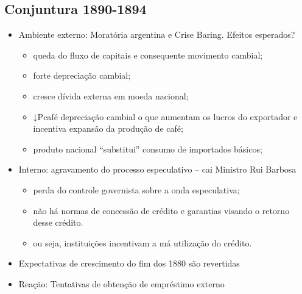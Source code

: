\documentclass[a4paper,12pt]{article}[abntex2]
\begin{document}
\subsection{\textbf{Conjuntura 1890-1894}}
\begin{itemize}
    \item Ambiente externo: Moratória argentina e Crise
Baring. Efeitos esperados?
\begin{itemize}
    \item queda do fluxo de capitais e consequente movimento cambial;
\end{itemize}
\begin{itemize}
    \item forte depreciação cambial;
\end{itemize}
\begin{itemize}
    \item cresce dívida externa em moeda nacional;
\end{itemize}
\begin{itemize}
    \item ↓Pcafé depreciação cambial o que aumentam os lucros do exportador e incentiva expansão da produção de café;
\end{itemize}
\begin{itemize}
    \item  produto nacional “substitui” consumo de importados básicos;
\end{itemize}
\item Interno: agravamento do processo especulativo – cai Ministro Rui Barbosa
\begin{itemize}
    \item perda do controle governista sobre a onda especulativa;\end{itemize}
\begin{itemize}
    \item  não há normas de concessão de crédito e garantias visando o retorno desse crédito.
\end{itemize}
\begin{itemize}
    \item  ou seja, instituições incentivam a má utilização do crédito.
\end{itemize}
\item Expectativas de crescimento do fim dos 1880 são revertidas
\item  Reação: Tentativas de obtenção de empréstimo externo
\end{itemize}
\end{document}
